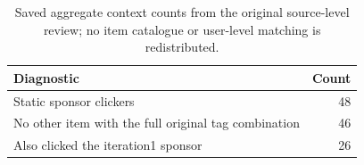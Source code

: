 \begin{table}[htbp!]
\centering
\small
\setlength{\tabcolsep}{3pt}
\renewcommand{\arraystretch}{1.1}
\begin{tabular}{lr}
\hline
Diagnostic & Count \\
\hline
Static sponsor clickers & 48 \\
No other item with the full original tag combination & 46 \\
Also clicked the iteration1 sponsor & 26 \\
\hline
\end{tabular}
\caption{Saved aggregate context counts from the original source-level review; no item catalogue or user-level matching is redistributed.}
\label{chap:results:tab:rq1_spike_context}
\end{table}
